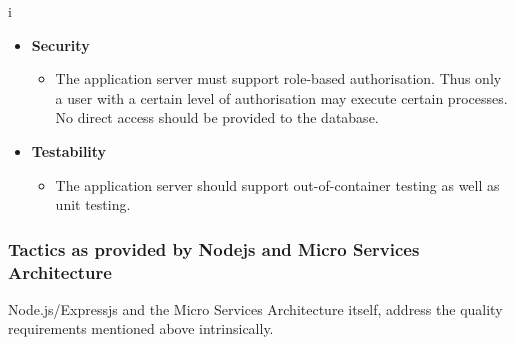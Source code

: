 i\documentclass[a4paper,12pt]{article}
\begin{document}
\begin{itemize}
		\item\textbf{Security}
		\begin{itemize}
			\item The application server must support role-based authorisation. Thus only a user with a certain level of authorisation may execute certain processes. No direct access should be provided to the database. 
		\end{itemize}
		
		\item\textbf{Testability}
		\begin{itemize}
			\item The application server should support out-of-container testing as well as unit testing.
		\end{itemize}
		
	\end{itemize}
	
	\newpage
	\subsubsection{Tactics as provided by Nodejs and Micro Services Architecture}
	Node.js/Expressjs and the Micro Services Architecture itself, address the quality requirements mentioned above intrinsically.
	
\end{document}
